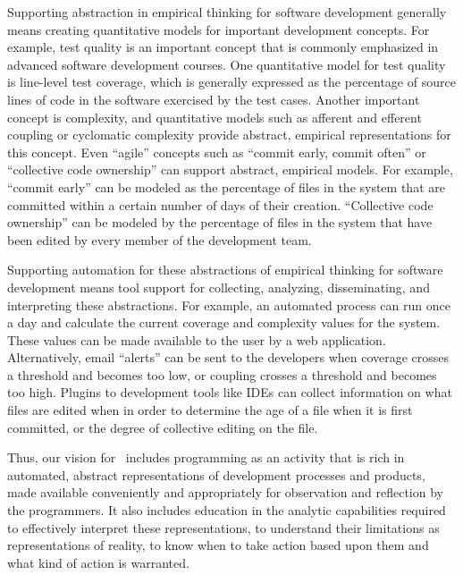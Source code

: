 Supporting abstraction in empirical thinking for software development
generally means creating quantitative models for important development
concepts.  For example, test quality is an important concept that is
commonly emphasized in advanced software development courses.  One
quantitative model for test quality is line-level test coverage, which is
generally expressed as the percentage of source lines of code in the
software exercised by the test cases.  Another important concept is
complexity, and quantitative models such as afferent and efferent coupling
or cyclomatic complexity provide abstract, empirical representations for
this concept.  Even ``agile'' concepts such as ``commit early, commit
often'' or ``collective code ownership'' can support abstract, empirical
models. For example, ``commit early'' can be modeled as the percentage of
files in the system that are committed within a certain number of days of
their creation.  ``Collective code ownership'' can be modeled by the
percentage of files in the system that have been edited by every member of
the development team.

Supporting automation for these abstractions of empirical thinking for
software development means tool support for collecting, analyzing,
disseminating, and interpreting these abstractions.  For example, an
automated process can run once a day and calculate the current coverage and
complexity values for the system.  These values can be made available to
the user by a web application. Alternatively, email ``alerts'' can be sent
to the developers when coverage crosses a threshold and becomes too low, or
coupling crosses a threshold and becomes too high.  Plugins to development
tools like IDEs can collect information on what files are edited when in
order to determine the age of a file when it is first committed, or the
degree of collective editing on the file.  

Thus, our vision for \eCT\ includes programming as an activity that is rich
in automated, abstract representations of development processes and
products, made available conveniently and appropriately for observation and
reflection by the programmers.  It also includes education in the analytic
capabilities required to effectively interpret these representations, to
understand their limitations as representations of reality, to know when to
take action based upon them and what kind of action is warranted.

